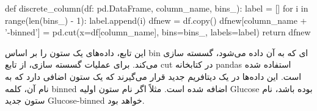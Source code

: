 \documentclass[12pt,titlepage,a4page , tikz , multi,table , svgnames,xcdraw]{article}
\begin{document}
  \begin{latin}
\begin{python}[language=Python]


def discrete_column(df: pd.DataFrame, column_name, bins_):
    label = []
    for i in range(len(bins_) - 1):
        label.append(i)
    dfnew = df.copy()
    dfnew[column_name + '-binned'] = pd.cut(x=df[column_name],
     bins=bins_, labels=label)
    return dfnew

\end{python}

\end{latin}

این تابع، داده‌های یک ستون را بر اساس bin ای که به آن داده می‌شود، گسسته سازی می‌کند. برای عملیات گسسته سازی، از تابع cut در کتابخانه pandas استفاده شده است. این داده‌ها در یک دیتافریم جدید قرار می‌گیرند که یک ستون اضافی دارد که به نام آن، کلمه binned اضافه شده است. مثلاً اگر نام ستون اولیه Glucose بوده باشد، نام ستون جدید Glucose-binned خواهد بود.

\newpage
\end{document}
